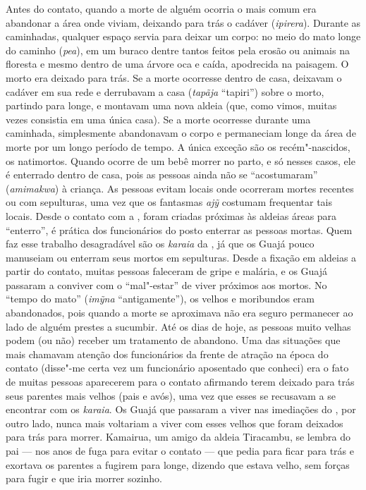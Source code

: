 Antes do contato, quando a morte de alguém ocorria o mais comum era
abandonar a área onde viviam, deixando para trás o cadáver
(\emph{ipirera}). Durante as caminhadas, qualquer espaço servia para
deixar um corpo: no meio do mato longe do caminho (\emph{pea}), em um
buraco dentre tantos feitos pela erosão ou animais na floresta e mesmo
dentro de uma árvore oca e caída, apodrecida na paisagem. O morto era
deixado para trás. Se a morte ocorresse dentro de casa, deixavam o
cadáver em sua rede e derrubavam a casa (\emph{tapãja} ``tapiri'') sobre
o morto, partindo para longe, e montavam uma nova aldeia (que, como
vimos, muitas vezes consistia em uma única casa). Se a morte ocorresse
durante uma caminhada, simplesmente abandonavam o corpo e permaneciam
longe da área de morte por um longo período de tempo. A única exceção
são os recém"-nascidos, os natimortos. Quando ocorre de um bebê morrer no
parto, e só nesses casos, ele é enterrado dentro de casa, pois as
pessoas ainda não se ``acostumaram'' (\emph{amimakwa}) à criança. As
pessoas evitam locais onde ocorreram mortes recentes ou com sepulturas,
uma vez que os fantasmas \emph{ajỹ} costumam frequentar tais locais.
Desde o contato com a , foram criadas próximas às aldeias áreas
para ``enterro'', é prática dos funcionários do posto enterrar as pessoas
mortas. Quem faz esse trabalho desagradável são os \emph{karaia} da
, já que os Guajá pouco manuseiam ou enterram seus mortos em
sepulturas. Desde a fixação em aldeias a partir do contato, muitas
pessoas faleceram de gripe e malária, e os Guajá passaram a conviver com
o ``mal"-estar'' de viver próximos aos mortos. No ``tempo do mato''
(\emph{imỹna} ``antigamente''), os velhos e moribundos eram abandonados,
pois quando a morte se aproximava não era seguro permanecer ao lado de
alguém prestes a sucumbir. Até os dias de hoje, as pessoas muito velhas
podem (ou não) receber um tratamento de abandono. Uma das situações que
mais chamavam atenção dos funcionários da frente de atração na época do
contato (disse"-me certa vez um funcionário aposentado que conheci) era o
fato de muitas pessoas aparecerem para o contato afirmando terem deixado
para trás seus parentes mais velhos (pais e avós), uma vez que esses se
recusavam a se encontrar com os \emph{karaia}. Os Guajá que passaram a
viver nas imediações do , por outro lado, nunca mais voltariam a
viver com esses velhos que foram deixados para trás para morrer.
Kamairua, um amigo da aldeia Tiracambu, se lembra do pai --- nos anos de
fuga para evitar o contato --- que pedia para ficar para trás e exortava os
parentes a fugirem para longe, dizendo que estava velho, sem forças para
fugir e que iria morrer sozinho.

